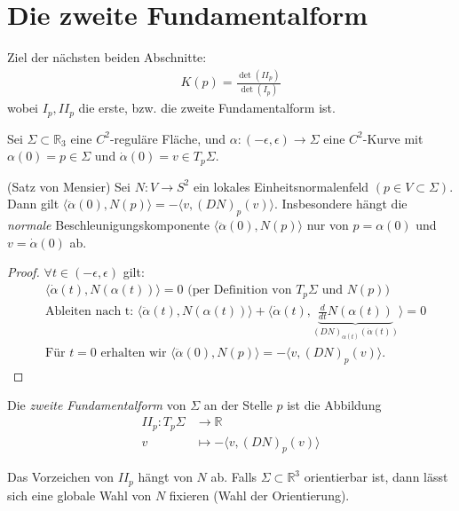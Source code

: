 \documentclass[../main.tex]{subfiles}
\begin{document}
\section{Die zweite Fundamentalform}
Ziel der nächsten beiden Abschnitte:
\begin{align*}
    K(p) = \frac{\det(II_{p})}{\det(I_{p})}
\end{align*}
wobei $I_{p}, II_{p}$ die erste, bzw. die zweite Fundamentalform ist.
\begin{motivation}
    Sei $\Sigma \subset \mathbb{R}_{3}$ eine $C^{2}$-reguläre Fläche, und $\alpha:(-\epsilon, \epsilon)\rightarrow \Sigma$ eine $C^{2}$-Kurve mit $\alpha(0) = p \in \Sigma$ und $\dot{\alpha}(0) = v \in T_{p}\Sigma$. 
\end{motivation}
\begin{proposition}
    (Satz von Mensier) Sei $N: V \rightarrow S^{2}$ ein lokales Einheitsnormalenfeld $(p\in V\subset\Sigma)$. Dann gilt $\langle \ddot{\alpha}(0), N(p)\rangle = -\langle v, (DN)_{p}(v)\rangle$. Insbesondere hängt die \emph{normale} Beschleunigungskomponente $\langle\ddot{\alpha}(0), N(p)\rangle$ nur von $p = \alpha(0)$ und $v = \dot{\alpha}(0)$ ab.
\end{proposition}
\begin{proof}
    $\forall t \in (-\epsilon,\epsilon)$ gilt:
    \begin{align*}
        &\langle \dot{\alpha}(t), N(\alpha(t))\rangle = 0 \text{ (per Definition von } T_{p}\Sigma \text{ und } N(p))\\
        &\text{Ableiten nach t: } \langle \ddot{\alpha}(t),N(\alpha(t))\rangle + \langle \dot{\alpha}(t), \underbrace{\frac{d}{dt}N(\alpha(t))}_{(DN)_{\alpha(t)}(\dot{\alpha}(t))} \rangle = 0\\
        &\text{Für } t=0 \text{ erhalten wir } \langle\ddot{\alpha}(0), N(p)\rangle = -\langle v, (DN)_{p}(v)\rangle.
    \end{align*}
\end{proof}
\begin{definition}
    Die \emph{zweite Fundamentalform} von $\Sigma$ an der Stelle $p$ ist die Abbildung
    \begin{align*}
        II_{p}:T_{p}\Sigma &\rightarrow \mathbb{R}\\
        v &\mapsto -\langle v, (DN)_{p}(v)\rangle 
    \end{align*}
\end{definition}
\begin{remark}
    Das Vorzeichen von $II_{p}$ hängt von $N$ ab. Falls $\Sigma \subset \mathbb{R}^{3}$ orientierbar ist, 
    dann lässt sich eine globale Wahl von $N$ fixieren (Wahl der Orientierung).
\end{remark}
\end{document}
